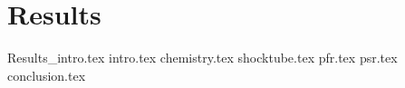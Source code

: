 \chapter{Results}


{Results_intro.tex}
{intro.tex}
{chemistry.tex}
{shocktube.tex}
{pfr.tex}
{psr.tex}
{conclusion.tex}